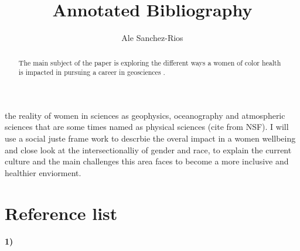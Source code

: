 \documentclass{tufte-handout}
\title{Annotated Bibliography}
\author[Ale Sanchez-Rios]{Ale Sanchez-Rios}
\begin{document}
\maketitle%

\begin{abstract}
\noindent The main subject of the paper is exploring the different ways a women of color health is impacted in pursuing a career in geosciences .
\end{abstract}


 the reality of women in sciences as geophysics, oceanography and atmospheric sciences that are some times named as physical sciences (cite from NSF). I will use a social juste frame work to descrbie the overal impact in a women wellbeing and close look at the intersectionalliy of gender and race, to explain the current culture and the main challenges this area faces to become a more inclusive and healthier enviorment. 

 \section{Reference list}
   
   
   
% 


\paragraph{1)}
   
\end{document}
